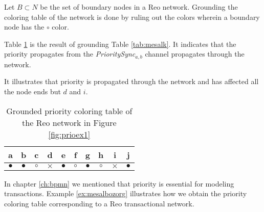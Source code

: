 \begin{axiom}
Let $B \subset N$ be the set of boundary nodes in a Reo network. Grounding the coloring table of the network is done by ruling out the colors wherein a boundary node has the $\circ$ color.
\end{axiom}

\noindent
Table \ref{tab:mesalkg} is the result of grounding Table  \ref{tab:mesalk}. It indicates that the priority propagates from the \emph{PrioritySync}$_{a,b}$ channel propagates through the network.


It illustrates that priority is propagated through the network and has affected all the node ends but $d$ and $i$. 

\begin{table}[H]
\centering
\begin{tabular}{|c|c|c|c|c|c|c|c|c|c|}
		\hline
			a & b &c & d &e &  f & g & h & i & j \\
 \hline
 $\bullet$ &$\bullet$ &$\circ$ &$\times$ &$\bullet$ &$\circ$ &$\bullet$ &$\circ$ &$\times$ &$\bullet$  \\  \hline \end{tabular}
   \caption{Grounded priority coloring table of the Reo network in Figure \ref{fig:prioex1}}
    \label{tab:mesalkg}
\end{table}


In chapter \ref{ch:bpmn} we mentioned that priority is essential for modeling transactions. Example \ref{ex:mesalbozorg} illustrates how we obtain the priority coloring table corresponding to a Reo transactional network.


